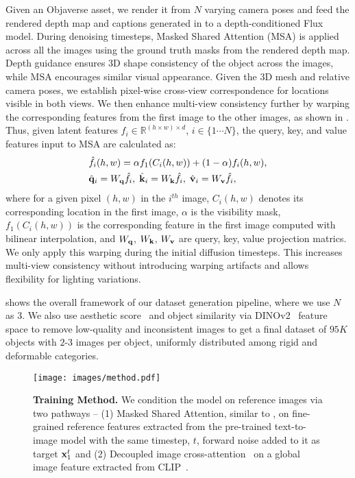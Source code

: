  Given an Objaverse asset, we render it from $N$ varying camera poses and feed the rendered depth map and captions generated in  to a depth-conditioned Flux model. During denoising timesteps, Masked Shared Attention (MSA) is applied across all the images using the ground truth masks from the rendered depth map. Depth guidance ensures 3D shape consistency of the object across the images, while MSA encourages similar visual appearance. %
Given the 3D mesh and relative camera poses, we establish pixel-wise cross-view correspondence for locations visible in both views. 
We then enhance multi-view consistency further by warping the corresponding features from the first image to the other images, as shown in . Thus, given latent features $f_i  \in \mathbb{R}^{(h \times w) \times d}$, $i \in \{1 \cdots N\}$, the query, key, and value features input to MSA are calculated as:
\vspace{-10pt}
\begin{equation}
    \begin{aligned}
   & \hat{f}_i(h,w) = \alpha f_1 (C_{i}(h,w)) + (1 - \alpha) f_i(h,w), \\
   & \hat{\q}_i = W_{\q} \hat{f}_i, \; \hat{\k}_i = W_{\k} \hat{f}_i, \; \hat{\v}_i = W_{\v} \hat{f}_i,
\end{aligned}\lbleq{msa_objaverse}
\end{equation}
where for a given pixel $(h,w)$ in the $i^{th}$ image, $C_{i}(h,w)$ denotes its corresponding location in the first image, $\alpha$ is the visibility mask, $f_1 (C_{i}(h,w))$ is the corresponding feature in the first image computed with bilinear interpolation, and $W_{{\mathbf{q}}}$, $W_{{\mathbf{k}}}$, $W_{{\mathbf{v}}}$ are query, key, value projection matrics. We only apply this warping during the initial diffusion timesteps. This increases multi-view consistency without introducing warping artifacts and allows flexibility for lighting variations. 




 shows the overall framework of our dataset generation pipeline, where we use $N$ as $3$. We also use aesthetic score~\cite{aesthetic} and object similarity via DINOv2~\cite{oquab2023dinov2} feature space to remove low-quality and inconsistent images to get a final dataset of $95K$ objects with $2$-$3$ images per object, uniformly distributed among rigid and deformable categories.

\begin{figure}[!t]
    \centering
    \texttt{[image: images/method.pdf]}
    \vspace{-18pt}
    \caption{{\textbf{Training Method.} We condition the model on reference images via two pathways -- (1) Masked Shared Attention, similar to , on fine-grained reference features extracted from the pre-trained text-to-image model with the same timestep, $t$, forward noise added to it as target ${\mathbf{x}}_1^t$ and (2) Decoupled image cross-attention~\cite{ye2023ip} on a global image feature extracted from CLIP~\cite{radford2021learning}.
    }
    }
    \vspace{-15pt}
\end{figure}

